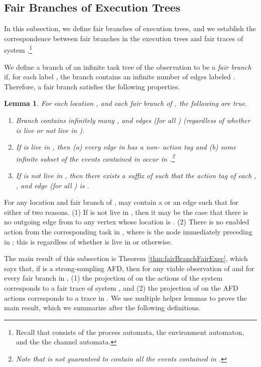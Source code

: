\documentclass[11pt]{article}
\numberwithin{theorem}{section}
\newtheorem{lemma}[theorem]{Lemma}
\begin{document}
\subsection{Fair Branches of Execution Trees}\label{subset:FairBranchesOfExecutionTrees}




In this subsection, we define fair branches of execution trees, and we establish the correspondence between fair branches
in the execution trees and fair traces of system .\footnote{Recall that  consists of the process automata, the environment automaton, and the the channel automata.} 

We define a branch of an infinite task tree  of the observation  to be a \emph{fair branch} if, for each label , the branch contains an infinite number of edges labeled . Therefore, a fair branch satisfies the following properties. 
\begin{lemma}\label{lem:fairTreeBranchProperties}
For each location , and each fair branch  of , the following are true.
\begin{enumerate}
\item Branch  contains infinitely many ,  and  edges (for all ) (regardless of whether  is live or not live in ).
\item If  is live in , then (a) every  edge in  has a non- action tag and (b) some infinite subset of the  events contained in  occur in .\footnote{Note that  is not guaranteed to contain all the  events contained in .}
\item If  is not live in , then there exists a suffix of  such that the action tag of each , , and  edge (for all ) is .
\end{enumerate}
\end{lemma}
For any location  and fair branch  of ,  may contain a  or an  edge  such that  for either of two reasons. (1) If  is not live in , then it may be the case that there is no outgoing edge from  to any vertex whose location is . (2) There is no enabled action from the corresponding task in , where  is the node immediately preceding  in ; this is regardless of whether  is live in  or otherwise.






The main result of this subsection is Theorem \ref{thm:fairBranchFairExec}, which says that, if  is a strong-sampling AFD, then for any viable observation  of  and for every fair branch  in , (1) the projection of  on the actions of the system  corresponds to a fair trace of system , and (2) the projection of  on the AFD actions corresponds to a trace in .
We use  multiple helper lemmas to prove the main result, which we summarize after the following definitions.
\end{document}
